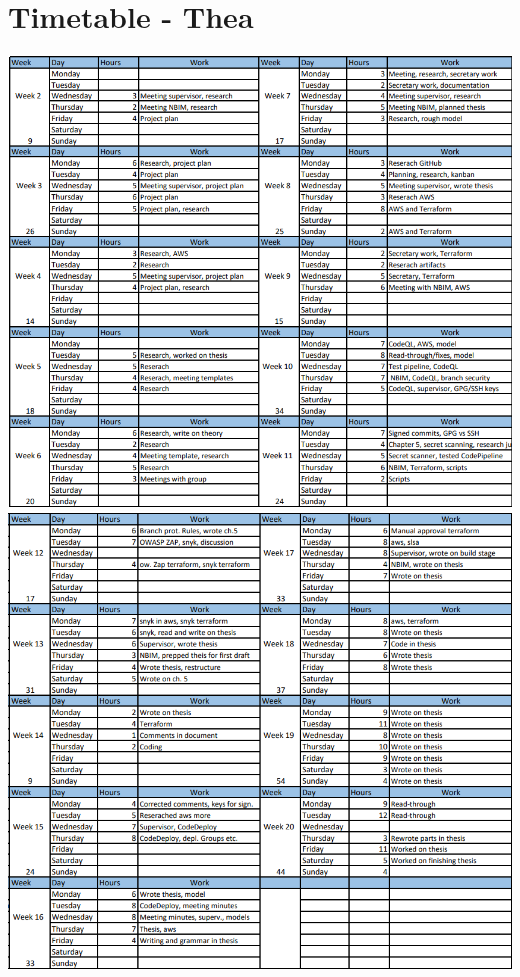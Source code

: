 \section{Timetable - Thea}
\vspace{3cm}
\includegraphics[width=\textwidth]{Images/theastimer1.png}
\newpage
\vspace{3cm}
\includegraphics[width=\textwidth]{Images/theastimer2.png}





